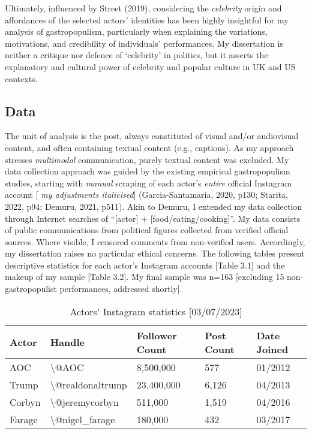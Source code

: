 \documentclass[a4paper, nobind]{templates/ociamthesis}
\begin{document}
Ultimately, influenced by Street (2019), considering the \emph{celebrity} origin and affordances of the selected actors' identities has been highly insightful for my analysis of gastropopulism, particularly when explaining the variations, motivations, and credibility of individuals' performances. My dissertation is neither a critique nor defence of `celebrity' in politics, but it asserts the explanatory and cultural power of celebrity and popular culture in UK and US contexts.

\hypertarget{data}{%
\subsection*{Data}\label{data}}

The unit of analysis is the post, always constituted of visual and/or audiovisual content, and often containing textual content (e.g., captions). As my approach stresses \emph{multimodal} communication, purely textual content was excluded. My data collection approach was guided by the existing empirical gastropopulism studies, starting with \emph{manual} scraping of each actor's \emph{entire} official Instagram account {[} \emph{my adjustments italicised}{]} (Garcia-Santamaria, 2020, p130; Starita, 2022, p94; Demuru, 2021, p511). Akin to Demuru, I extended my data collection through Internet searches of ``{[}actor{]} + {[}food/eating/cooking{]}''. My data consists of public communications from political figures collected from verified official sources. Where visible, I censored comments from non-verified users. Accordingly, my dissertation raises no particular ethical concerns. The following tables present descriptive statistics for each actor's Instagram accounts {[}Table 3.1{]} and the makeup of my sample {[}Table 3.2{]}. My final sample was n=163 {[}excluding 15 non-gastropopulist performances, addressed shortly{]}.

\begin{table}

\caption{\label{tab:unnamed-chunk-1}Actors’ Instagram statistics [03/07/2023]}
\centering
\begin{tabular}[t]{l|l|l|l|l}
\hline
Actor & Handle & Follower Count & Post Count & Date Joined\\
\hline
AOC & \textbackslash{}@AOC & 8,500,000 & 577 & 01/2012\\
\hline
Trump & \textbackslash{}@realdonaltrump & 23,400,000 & 6,126 & 04/2013\\
\hline
Corbyn & \textbackslash{}@jeremycorbyn & 511,000 & 1,519 & 04/2016\\
\hline
Farage & \textbackslash{}@nigel\_farage & 180,000 & 432 & 03/2017\\
\hline
\end{tabular}
\end{table}
\end{document}
